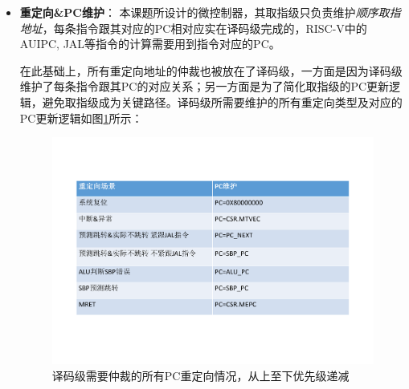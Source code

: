\documentclass[a4paper, 12pt]{article}
\begin{document}
\begin{itemize}
    \item \textbf{重定向\&PC维护}：
      本课题所设计的微控制器，其取指级只负责维护\textit{顺序取指地址}，每条指令跟其对应的PC相对应实在译码级完成的，RISC-V中的AUIPC, JAL等指令的计算需要用到指令对应的PC。

      在此基础上，所有重定向地址的仲裁也被放在了译码级，一方面是因为译码级维护了每条指令跟其PC的对应关系；另一方面是为了简化取指级的PC更新逻辑，避免取指级成为关键路径。译码级所需要维护的所有重定向类型及对应的PC更新逻辑如图\ref{fig:pc_redirection}所示：
  \begin{figure}[htbp]
    \centering
    \includegraphics[width=0.8\linewidth]{./images/pc_redirection.pdf}
    \caption{译码级需要仲裁的所有PC重定向情况，从上至下优先级递减}
    \label{fig:pc_redirection}
  \end{figure}


  \end{itemize}  
\end{document}
